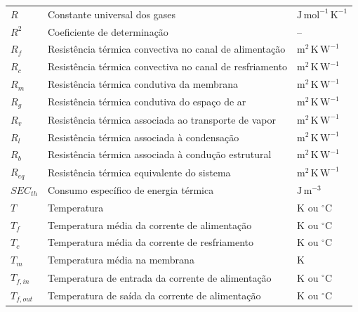 \begin{longtable}{>{\raggedright\arraybackslash}p{3cm}
                  >{\raggedright\arraybackslash}p{9.5cm}
                  >{\raggedright\arraybackslash}p{3cm}}
$R$ & Constante universal dos gases & $\mathrm{J\,mol^{-1}\,K^{-1}}$ \\

$R^2$ & Coeficiente de determinação & -- \\

$R_f$ & Resistência térmica convectiva no canal de alimentação & $\mathrm{m^2\,K\,W^{-1}}$ \\

$R_c$ & Resistência térmica convectiva no canal de resfriamento & $\mathrm{m^2\,K\,W^{-1}}$ \\

$R_m$ & Resistência térmica condutiva da membrana & $\mathrm{m^2\,K\,W^{-1}}$ \\

$R_g$ & Resistência térmica condutiva do espaço de ar & $\mathrm{m^2\,K\,W^{-1}}$ \\

$R_v$ & Resistência térmica associada ao transporte de vapor & $\mathrm{m^2\,K\,W^{-1}}$ \\

$R_l$ & Resistência térmica associada à condensação & $\mathrm{m^2\,K\,W^{-1}}$ \\

$R_b$ & Resistência térmica associada à condução estrutural & $\mathrm{m^2\,K\,W^{-1}}$ \\

$R_{eq}$ & Resistência térmica equivalente do sistema & $\mathrm{m^2\,K\,W^{-1}}$ \\

$SEC_{th}$ & Consumo específico de energia térmica & $\mathrm{J\,m^{-3}}$ \\

$T$ & Temperatura & $\mathrm{K}$ ou $^\circ\mathrm{C}$ \\

$T_f$ & Temperatura média da corrente de alimentação & $\mathrm{K}$ ou $^\circ\mathrm{C}$ \\

$T_c$ & Temperatura média da corrente de resfriamento & $\mathrm{K}$ ou $^\circ\mathrm{C}$ \\

$T_m$ & Temperatura média na membrana & $\mathrm{K}$ \\

$T_{f,in}$ & Temperatura de entrada da corrente de alimentação & $\mathrm{K}$ ou $^\circ\mathrm{C}$ \\

$T_{f,out}$ & Temperatura de saída da corrente de alimentação & $\mathrm{K}$ ou $^\circ\mathrm{C}$ \\


\end{longtable}
